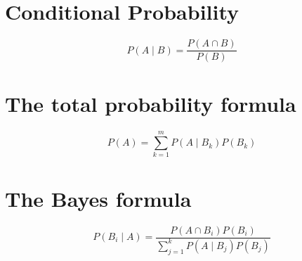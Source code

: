 \documentclass[11pt]{article}
\begin{document}
    \section{Conditional Probability}\label{sec:conditional_probability}

    \begin{equation}
        P(A \mid B) = \frac{P(A\cap B)}{P(B)}
    \end{equation}

    \section{The total probability formula}\label{sec:total_probability}

    \begin{equation}
        P(A) = \sum_{k=1}^m P(A \mid B_k)P(B_k)
    \end{equation}

    \section{The Bayes formula}\label{sec:bayes_formula}

    \begin{equation}
        P(B_i \mid A) = \frac{P(A\cap B_i)P(B_i)}{\sum_{j=1}^k P(A \mid B_j)P(B_j)}
    \end{equation}
\end{document}
